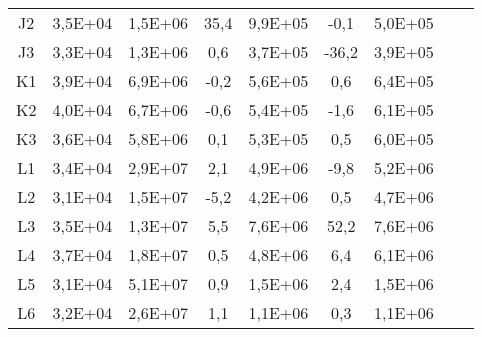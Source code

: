 \begin{center}
\begin{longtable}{ccccccccc}
J2&3,5E+04&1,5E+06&35,4&9,9E+05&-0,1&5,0E+05\\
J3&3,3E+04&1,3E+06&0,6&3,7E+05&-36,2&3,9E+05\\
K1&3,9E+04&6,9E+06&-0,2&5,6E+05&0,6&6,4E+05\\
K2&4,0E+04&6,7E+06&-0,6&5,4E+05&-1,6&6,1E+05\\
K3&3,6E+04&5,8E+06&0,1&5,3E+05&0,5&6,0E+05\\
L1&3,4E+04&2,9E+07&2,1&4,9E+06&-9,8&5,2E+06\\
L2&3,1E+04&1,5E+07&-5,2&4,2E+06&0,5&4,7E+06\\
L3&3,5E+04&1,3E+07&5,5&7,6E+06&52,2&7,6E+06\\
L4&3,7E+04&1,8E+07&0,5&4,8E+06&6,4&6,1E+06\\
L5&3,1E+04&5,1E+07&0,9&1,5E+06&2,4&1,5E+06\\
L6&3,2E+04&2,6E+07&1,1&1,1E+06&0,3&1,1E+06\\

\end{longtable}
\end{center}

